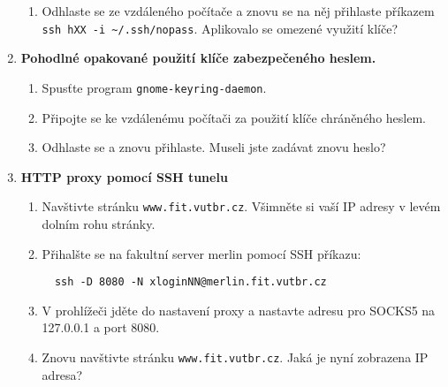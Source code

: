 \begin{enumerate}
\begin{enumerate}
      \item Odhlaste se ze vzdáleného počítače a znovu se na něj přihlaste
        příkazem {\tt ssh hXX -i \textasciitilde/.ssh/nopass}. Aplikovalo se
        omezené využití klíče?

    \end{enumerate}


  \item {\bf Pohodlné opakované použití klíče zabezpečeného heslem.}

    \begin{enumerate}

      \item Spusťte program {\tt gnome-keyring-daemon}.

      \item Připojte se ke vzdálenému počítači za použití klíče chráněného
        heslem.

      \item Odhlaste se a znovu přihlaste. Museli jste zadávat znovu heslo?

    \end{enumerate}

      \item {\bf HTTP proxy pomocí SSH tunelu}

    \begin{enumerate}

      \item Navštivte stránku {\tt www.fit.vutbr.cz}. Všimněte si vaší IP adresy v levém dolním rohu stránky.

      \item Přihalšte se na fakultní server merlin pomocí SSH příkazu:
\begin{verbatim}
  ssh -D 8080 -N xloginNN@merlin.fit.vutbr.cz
\end{verbatim}

      \item V prohlížeči jděte do nastavení proxy a nastavte adresu pro SOCKS5 na 127.0.0.1 a port 8080.

      \item Znovu navštivte stránku {\tt www.fit.vutbr.cz}. Jaká je nyní zobrazena IP adresa?

    \end{enumerate}

\end{enumerate}


